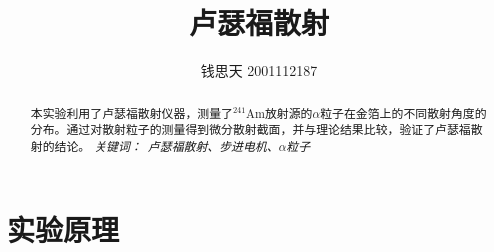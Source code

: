 \documentclass{article}
\title{卢瑟福散射}
\author{钱思天 2001112187}
\begin{document}
    \maketitle
    \begin{abstract}
        本实验利用了卢瑟福散射仪器，测量了$^{241}\text{Am}$放射源的$\alpha$粒子在金箔上的不同散射角度的分布。通过对散射粒子的测量得到微分散射截面，并与理论结果比较，验证了卢瑟福散射的结论。
        \newline
        \newline
        {\emph{ 关键词：\ 卢瑟福散射、步进电机、$\alpha$粒子 }\rm}

    \end{abstract}

\section{实验原理}
\end{document}
